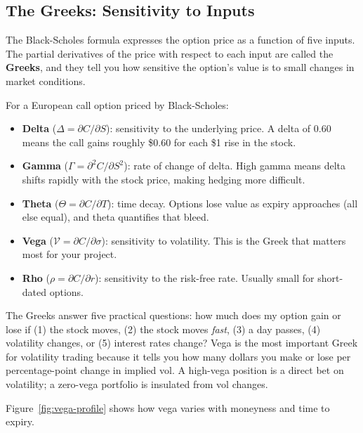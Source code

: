 \subsection{The Greeks: Sensitivity to Inputs}
\label{sec:greeks}

The Black-Scholes formula expresses the option price as a function of five inputs.
The partial derivatives of the price with respect to each input are called the \textbf{Greeks}, and they tell you how sensitive the option's value is to small changes in market conditions.

\begin{definition}
\label{def:greeks}
For a European call option priced by Black-Scholes:
\begin{itemize}[nosep]
  \item \textbf{Delta} ($\Delta = \partial C / \partial S$): sensitivity to the underlying price. A delta of 0.60 means the call gains roughly \$0.60 for each \$1 rise in the stock.
  \item \textbf{Gamma} ($\Gamma = \partial^2 C / \partial S^2$): rate of change of delta. High gamma means delta shifts rapidly with the stock price, making hedging more difficult.
  \item \textbf{Theta} ($\Theta = \partial C / \partial T$): time decay. Options lose value as expiry approaches (all else equal), and theta quantifies that bleed.
  \item \textbf{Vega} ($\mathcal{V} = \partial C / \partial \sigma$): sensitivity to volatility. This is the Greek that matters most for your project.
  \item \textbf{Rho} ($\rho = \partial C / \partial r$): sensitivity to the risk-free rate. Usually small for short-dated options.
\end{itemize}
\end{definition}

\begin{intuition}
The Greeks answer five practical questions: how much does my option gain or lose if (1) the stock moves, (2) the stock moves \emph{fast}, (3) a day passes, (4) volatility changes, or (5) interest rates change?
Vega is the most important Greek for volatility trading because it tells you how many dollars you make or lose per percentage-point change in implied vol.
A high-vega position is a direct bet on volatility; a zero-vega portfolio is insulated from vol changes.
\end{intuition}

Figure~\ref{fig:vega-profile} shows how vega varies with moneyness and time to expiry.

